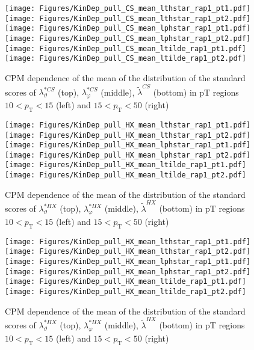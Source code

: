 \documentclass[12pt]{article}
\newcommand{\pT}{p_\mathrm{T}}
\newcommand{\lamtildeCS}{\tilde{\lambda}^{\scriptscriptstyle CS}}
\newcommand{\lamthstarCS}{\lambda^{* \scriptscriptstyle CS}_\vartheta}
\newcommand{\lamphstarCS}{\lambda^{* \scriptscriptstyle CS}_\varphi}
\newcommand{\lamtildeHX}{\tilde{\lambda}^{\scriptscriptstyle HX}}
\newcommand{\lamthstarHX}{\lambda^{* \scriptscriptstyle HX}_\vartheta}
\newcommand{\lamphstarHX}{\lambda^{* \scriptscriptstyle HX}_\varphi}
\begin{document}
\begin{figure}[htbp]
\centering
\texttt{[image: Figures/KinDep\_pull\_CS\_mean\_lthstar\_rap1\_pt1.pdf]}
\texttt{[image: Figures/KinDep\_pull\_CS\_mean\_lthstar\_rap1\_pt2.pdf]}
\texttt{[image: Figures/KinDep\_pull\_CS\_mean\_lphstar\_rap1\_pt1.pdf]}
\texttt{[image: Figures/KinDep\_pull\_CS\_mean\_lphstar\_rap1\_pt2.pdf]}
\texttt{[image: Figures/KinDep\_pull\_CS\_mean\_ltilde\_rap1\_pt1.pdf]}
\texttt{[image: Figures/KinDep\_pull\_CS\_mean\_ltilde\_rap1\_pt2.pdf]}
\caption{CPM dependence of the mean of the distribution of the standard scores
of $\lamthstarCS$ (top), $\lamphstarCS$ (middle), $\lamtildeCS$ (bottom) in
pT regions $10<\pT<15$ (left) and $15<\pT<50$ (right)}
\end{figure}
\clearpage




\begin{figure}[htbp]
\centering
\texttt{[image: Figures/KinDep\_pull\_HX\_mean\_lthstar\_rap1\_pt1.pdf]}
\texttt{[image: Figures/KinDep\_pull\_HX\_mean\_lthstar\_rap1\_pt2.pdf]}
\texttt{[image: Figures/KinDep\_pull\_HX\_mean\_lphstar\_rap1\_pt1.pdf]}
\texttt{[image: Figures/KinDep\_pull\_HX\_mean\_lphstar\_rap1\_pt2.pdf]}
\texttt{[image: Figures/KinDep\_pull\_HX\_mean\_ltilde\_rap1\_pt1.pdf]}
\texttt{[image: Figures/KinDep\_pull\_HX\_mean\_ltilde\_rap1\_pt2.pdf]}
\caption{CPM dependence of the mean of the distribution of the standard scores
of $\lamthstarHX$ (top), $\lamphstarHX$ (middle), $\lamtildeHX$ (bottom) in
pT regions $10<\pT<15$ (left) and $15<\pT<50$ (right)}
\end{figure}
\clearpage


\begin{figure}[htbp]
\centering
\texttt{[image: Figures/KinDep\_pull\_HX\_mean\_lthstar\_rap1\_pt1.pdf]}
\texttt{[image: Figures/KinDep\_pull\_HX\_mean\_lthstar\_rap1\_pt2.pdf]}
\texttt{[image: Figures/KinDep\_pull\_HX\_mean\_lphstar\_rap1\_pt1.pdf]}
\texttt{[image: Figures/KinDep\_pull\_HX\_mean\_lphstar\_rap1\_pt2.pdf]}
\texttt{[image: Figures/KinDep\_pull\_HX\_mean\_ltilde\_rap1\_pt1.pdf]}
\texttt{[image: Figures/KinDep\_pull\_HX\_mean\_ltilde\_rap1\_pt2.pdf]}
\caption{CPM dependence of the mean of the distribution of the standard scores
of $\lamthstarHX$ (top), $\lamphstarHX$ (middle), $\lamtildeHX$ (bottom) in
pT regions $10<\pT<15$ (left) and $15<\pT<50$ (right)}
\end{figure}
\clearpage
\end{document}
